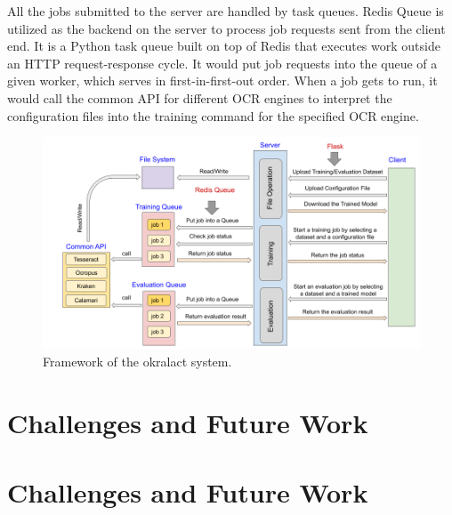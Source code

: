 \documentclass[conference]{IEEEtran}
\begin{document}
All the jobs submitted to the server are handled by task queues. Redis Queue is 
utilized as the backend on the server to process job requests sent from the     
client end. It is a Python task queue built on top of Redis that executes work  
outside an HTTP request-response cycle. It would put job requests into the      
queue of a given worker, which serves in first-in-first-out order. When a job   
gets to run, it would call the common API for different OCR engines to
interpret the configuration files into the training command for the specified
OCR engine.

\begin{figure}[ht!]
        \begin{center}
     \includegraphics[width=0.8\linewidth]{Figures/Framework.png}
        \end{center}
        \caption{\small{Framework of the okralact system.}}
\label{fig:framework}
\end{figure}

\section*{Challenges and Future Work}


\section*{Challenges and Future Work}


\end{document}
